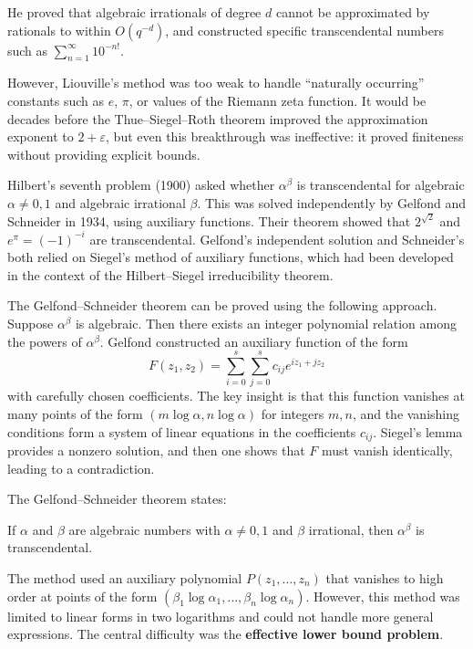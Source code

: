 He proved that algebraic irrationals of degree $d$ cannot be approximated by rationals to within $O(q^{-d})$, and constructed specific transcendental numbers such as $\sum_{n=1}^{\infty} 10^{-n!}$.

However, Liouville's method was too weak to handle ``naturally occurring'' constants such as $e$, $\pi$, or values of the Riemann zeta function. It would be decades before the Thue--Siegel--Roth theorem improved the approximation exponent to $2 + \varepsilon$, but even this breakthrough was ineffective: it proved finiteness without providing explicit bounds.

Hilbert's seventh problem (1900) asked whether $\alpha^\beta$ is transcendental for algebraic $\alpha \neq 0, 1$ and algebraic irrational $\beta$. This was solved independently by Gelfond and Schneider in 1934, using auxiliary functions. Their theorem showed that $2^{\sqrt{2}}$ and $e^\pi = (-1)^{-i}$ are transcendental. Gelfond's independent solution and Schneider's both relied on Siegel's method of auxiliary functions, which had been developed in the context of the Hilbert--Siegel irreducibility theorem.

The Gelfond--Schneider theorem can be proved using the following approach. Suppose $\alpha^\beta$ is algebraic. Then there exists an integer polynomial relation among the powers of $\alpha^\beta$. Gelfond constructed an auxiliary function of the form
\[
F(z_1, z_2) = \sum_{i=0}^s \sum_{j=0}^s c_{ij} e^{i z_1 + j z_2}
\]
with carefully chosen coefficients. The key insight is that this function vanishes at many points of the form $(m \log \alpha, n \log \alpha)$ for integers $m, n$, and the vanishing conditions form a system of linear equations in the coefficients $c_{ij}$. Siegel's lemma provides a nonzero solution, and then one shows that $F$ must vanish identically, leading to a contradiction.

The Gelfond--Schneider theorem states:

\begin{theorem}
If $\alpha$ and $\beta$ are algebraic numbers with $\alpha \neq 0, 1$ and $\beta$ irrational, then $\alpha^\beta$ is transcendental.
\end{theorem}

The method used an auxiliary polynomial $P(z_1, \ldots, z_n)$ that vanishes to high order at points of the form $(\beta_1 \log \alpha_1, \ldots, \beta_n \log \alpha_n)$. However, this method was limited to linear forms in two logarithms and could not handle more general expressions. The central difficulty was the \textbf{effective lower bound problem}.

